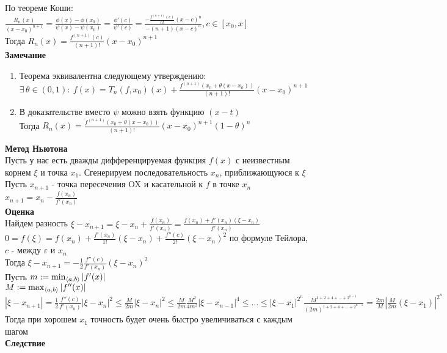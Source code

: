\documentclass[12pt]{article}
\begin{document}
По теореме Коши:\\
$\frac{R_n(x)}{(x-x_0)^{n+1}} = \frac{\phi(x)-\phi(x_0)}{\psi(x)-\psi(x_0)} = \frac{\phi'(c)}{\psi'(c)} = \frac{-\frac{f^{(n+1)}(c)}{n!}(x-c)^n}{-(n+1)(x-c)^n}, c \in [x_0, x]$\\
Тогда $R_n(x) = \frac{f^{(n+1)}(c)}{(n+1)!}(x-x_0)^{n+1}$\\
\textbf{Замечание}
\begin{enumerate}
    \item Теорема эквивалентна следующему утверждению:\\
    $\exists\,\theta\in (0, 1):\ f(x) = T_n(f, x_0)(x) + \frac{f^{(n+1)}(x_0+\theta(x-x_0))}{(n+1)!}(x-x_0)^{n+1}$
    \item В доказательстве вместо $\psi$ можно взять функцию $(x-t)$\\
    Тогда $R_n(x) = \frac{f^{(n+1)}(x_0+\theta(x-x_0))}{(n+1)!}(x-x_0)^{n+1}(1-\theta)^n$
\end{enumerate}
\textbf{Метод Ньютона}\\
Пусть у нас есть дважды дифференцируемая функция $f(x)$ с неизвестным корнем $\xi$ и точка $x_1$. Сгенерируем последовательность $x_n$, приближающуюся к $\xi$\\
Пусть $x_{n+1}$ - точка пересечения OX и касательной к $f$ в точке $x_n$\\
$x_{n+1} = x_n - \frac{f(x_n)}{f'(x_n)}$\\
\textbf{Оценка}\\
Найдем разность $\xi - x_{n+1} = \xi - x_n + \frac{f(x_n)}{f'(x_n)} = \frac{f(x_n)+f'(x_n)(\xi - x_n)}{f'(x_n)}$\\
$0 = f(\xi) = f(x_n) + \frac{f'(x_n)}{1!}(\xi - x_n) + \frac{f''(c)}{2!}(\xi - x_n)^2$ по формуле Тейлора, $c$ - между $\varepsilon$ и $x_n$\\
Тогда $\xi - x_{n+1} = -\frac12 \frac{f''(c)}{f'(x_n)}(\xi-x_n)^2$\\
Пусть $m := \min_{\langle a, b\rangle} |f'(x)|$\\
$M := \max_{\langle a, b \rangle} |f''(x)|$\\
$|\xi - x_{n+1}| = \frac12 \frac{f''(c)}{f'(x_n)}|\xi-x_n|^2 \leq \frac{M}{2m}|\xi-x_n|^2 \leq \frac{M}{2m} \frac{M^2}{4m^2} |\xi - x_{n-1}|^4 \leq \ldots \leq |\xi - x_1| ^{2^n} \frac{M^{1+2+4+\ldots+2^{n-1}}}{(2m)^{1+2+4+\ldots+2^{n-1}}} = \frac{2m}{M}|\frac{M}{2m}(\xi - x_1)|^{2^n}$\\
Тогда при хорошем $x_1$ точность будет очень быстро увеличиваться с каждым шагом\\
\textbf{Следствие}\\
\end{document}

